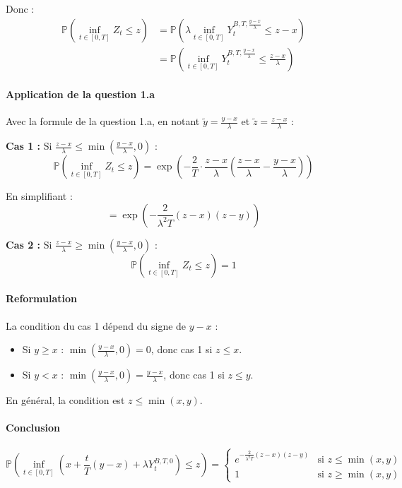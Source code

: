 \documentclass[12pt,a4paper]{article}
\theoremstyle{definition}
\theoremstyle{remark}
\newcommand{\Prob}{\mathbb{P}}
\begin{document}
Donc :
\begin{align*}
\Prob\left(\inf_{t \in [0,T]} Z_t \leq z\right) &= \Prob\left(\lambda \inf_{t \in [0,T]} Y_t^{B,T,\frac{y-x}{\lambda}} \leq z - x\right) \\
&= \Prob\left(\inf_{t \in [0,T]} Y_t^{B,T,\frac{y-x}{\lambda}} \leq \frac{z-x}{\lambda}\right)
\end{align*}

\paragraph{Application de la question 1.a}

Avec la formule de la question 1.a, en notant $\tilde{y} = \frac{y-x}{\lambda}$ et $\tilde{z} = \frac{z-x}{\lambda}$ :

\textbf{Cas 1 :} Si $\frac{z-x}{\lambda} \leq \min\left(\frac{y-x}{\lambda}, 0\right)$ :
\[
\Prob\left(\inf_{t \in [0,T]} Z_t \leq z\right) = \exp\left(-\frac{2}{T}\cdot\frac{z-x}{\lambda}\left(\frac{z-x}{\lambda} - \frac{y-x}{\lambda}\right)\right)
\]

En simplifiant :
\[
= \exp\left(-\frac{2}{\lambda^2 T}(z-x)(z-y)\right)
\]

\textbf{Cas 2 :} Si $\frac{z-x}{\lambda} \geq \min\left(\frac{y-x}{\lambda}, 0\right)$ :
\[
\Prob\left(\inf_{t \in [0,T]} Z_t \leq z\right) = 1
\]

\paragraph{Reformulation}

La condition du cas 1 dépend du signe de $y-x$ :
\begin{itemize}
\item Si $y \geq x$ : $\min\left(\frac{y-x}{\lambda}, 0\right) = 0$, donc cas 1 si $z \leq x$.
\item Si $y < x$ : $\min\left(\frac{y-x}{\lambda}, 0\right) = \frac{y-x}{\lambda}$, donc cas 1 si $z \leq y$.
\end{itemize}

En général, la condition est $z \leq \min(x,y)$.

\paragraph{Conclusion}

\[
\boxed{
\Prob\left(\inf_{t \in [0,T]} \left(x + \frac{t}{T}(y-x) + \lambda Y_t^{B,T,0}\right) \leq z\right) = \begin{cases}
e^{-\frac{2}{\lambda^2 T}(z-x)(z-y)} & \text{si } z \leq \min(x,y) \\
1 & \text{si } z \geq \min(x,y)
\end{cases}
}
\]
\end{document}
